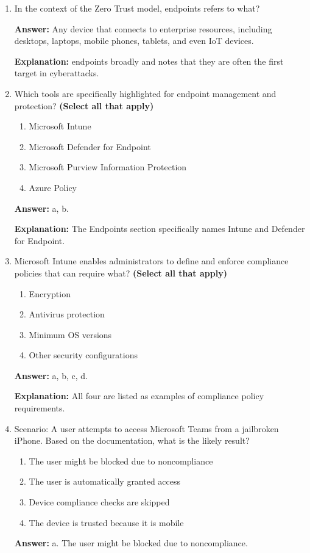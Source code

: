 \documentclass[10pt]{article}
\begin{document}
\begin{enumerate}[leftmargin=*]
\textbf{Answer:} True.

\textbf{Explanation:} This sentence closely follows the wording used in the documentation.

\item In the context of the Zero Trust model, endpoints refers to what?

\textbf{Answer:} Any device that connects to enterprise resources, including desktops, laptops, mobile phones, tablets, and even IoT devices.

\textbf{Explanation:} endpoints broadly and notes that they are often the first target in cyberattacks.

\item Which tools are specifically highlighted for endpoint management and protection? \textbf{(Select all that apply)}
\begin{enumerate}[label=\alph*., leftmargin=1.5em]
\item Microsoft Intune
\item Microsoft Defender for Endpoint
\item Microsoft Purview Information Protection
\item Azure Policy
\end{enumerate}
\textbf{Answer:} a, b.

\textbf{Explanation:} The Endpoints section specifically names Intune and Defender for Endpoint.

\item Microsoft Intune enables administrators to define and enforce compliance policies that can require what? \textbf{(Select all that apply)}
\begin{enumerate}[label=\alph*., leftmargin=1.5em]
\item Encryption
\item Antivirus protection
\item Minimum OS versions
\item Other security configurations
\end{enumerate}
\textbf{Answer:} a, b, c, d.

\textbf{Explanation:} All four are listed as examples of compliance policy requirements.

\item Scenario: A user attempts to access Microsoft Teams from a jailbroken iPhone. Based on the documentation, what is the likely result?
\begin{enumerate}[label=\alph*., leftmargin=1.5em]
\item The user might be blocked due to noncompliance
\item The user is automatically granted access
\item Device compliance checks are skipped
\item The device is trusted because it is mobile
\end{enumerate}
\textbf{Answer:} a. The user might be blocked due to noncompliance.


\end{enumerate}
\end{document}
